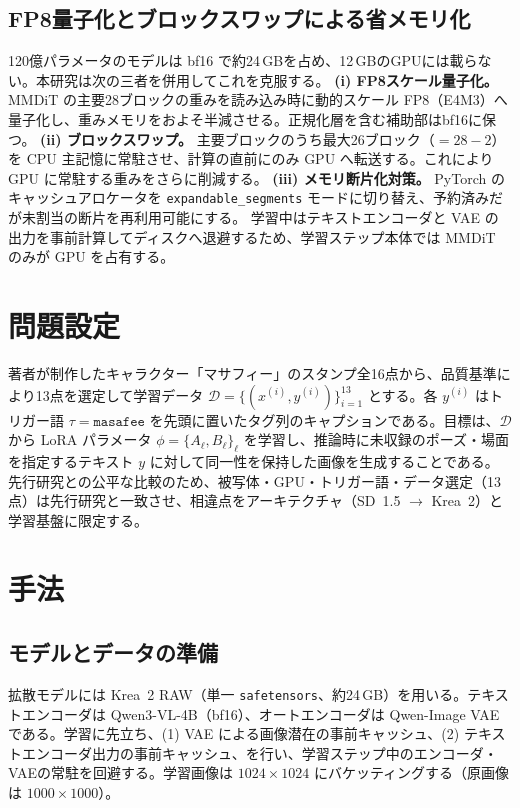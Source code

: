 \documentclass[10pt,twocolumn]{ltjsarticle}
\begin{document}
\subsection{FP8量子化とブロックスワップによる省メモリ化}
\label{sec:mem}
120億パラメータのモデルは bf16 で約24\,GBを占め、12\,GBのGPUには載らない。本研究は次の三者を併用してこれを克服する。
\textbf{(i) FP8スケール量子化。} MMDiT の主要28ブロックの重みを読み込み時に動的スケール FP8（E4M3）へ量子化し、重みメモリをおよそ半減させる。正規化層を含む補助部はbf16に保つ。
\textbf{(ii) ブロックスワップ。} 主要ブロックのうち最大26ブロック（$=28-2$）を CPU 主記憶に常駐させ、計算の直前にのみ GPU へ転送する。これにより GPU に常駐する重みをさらに削減する。
\textbf{(iii) メモリ断片化対策。} PyTorch のキャッシュアロケータを \texttt{expandable\_segments} モードに切り替え、予約済みだが未割当の断片を再利用可能にする。
学習中はテキストエンコーダと VAE の出力を事前計算してディスクへ退避するため、学習ステップ本体では MMDiT のみが GPU を占有する。

\section{問題設定}
著者が制作したキャラクター「マサフィー」のスタンプ全16点から、品質基準により13点を選定して学習データ $\mathcal{D}=\{(x^{(i)},y^{(i)})\}_{i=1}^{13}$ とする。各 $y^{(i)}$ はトリガー語 $\tau=\texttt{masafee}$ を先頭に置いたタグ列のキャプションである。目標は、$\mathcal{D}$ から LoRA パラメータ $\phi=\{A_\ell,B_\ell\}_\ell$ を学習し、推論時に未収録のポーズ・場面を指定するテキスト $y$ に対して同一性を保持した画像を生成することである。先行研究との公平な比較のため、被写体・GPU・トリガー語・データ選定（13点）は先行研究と一致させ、相違点をアーキテクチャ（SD~1.5 $\to$ Krea~2）と学習基盤に限定する。

\section{手法}
\subsection{モデルとデータの準備}
拡散モデルには Krea~2 RAW（単一 \texttt{safetensors}、約24\,GB）を用いる。テキストエンコーダは Qwen3-VL-4B（bf16）、オートエンコーダは Qwen-Image VAE である。学習に先立ち、(1) VAE による画像潜在の事前キャッシュ、(2) テキストエンコーダ出力の事前キャッシュ、を行い、学習ステップ中のエンコーダ・VAEの常駐を回避する。学習画像は $1024\times1024$ にバケッティングする（原画像は $1000\times1000$）。
\end{document}
